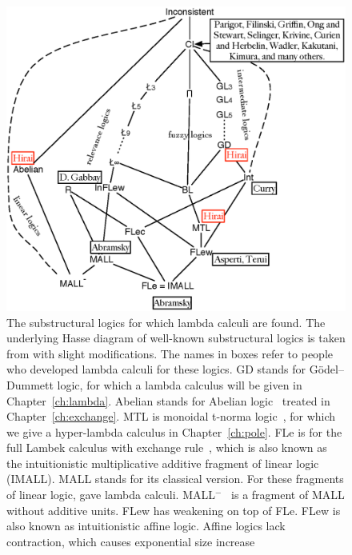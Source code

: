  \begin{figure}
  \centering
  \includegraphics[scale=0.8]{lattice.eps}
  \caption[The lattice of substructural logics, some of which with known lambda calculi.]
  {\small
  The substructural logics for which lambda calculi are found.
  The underlying Hasse diagram of well-known substructural logics is
  taken from
  \cite[p.~120]{residuated} with slight modifications.
  The names in boxes refer to people who developed lambda calculi for
  these logics.{
  \textsf{GD} stands for G\"odel--Dummett logic, for which
  a lambda calculus will be given in
  Chapter~\ref{ch:lambda}.
  \textsf{Abelian} stands for Abelian
  logic~\citep{meyer-slaney-1989,casari1989,metcalfe2002}
  treated in Chapter~\ref{ch:exchange}.
  \textsf{MTL} is monoidal t-norma logic~\cite{Esteva2001271}, for which
  we give a hyper-lambda calculus in Chapter~\ref{ch:pole}.
  \textsf{FLe} is for the full Lambek calculus with exchange
  rule~\citep[p.86]{residuated}, which is also known as the
  intuitionistic
  multiplicative additive fragment of linear logic (\textsf{IMALL}).
  \textsf{MALL} stands for its classical version.  For these fragments of linear
  logic,
  \citet{abramsky1993computational} gave lambda calculi.
  \textsf{MALL}$^-$~\citep{girard1987}
  is a fragment of \textsf{MALL} without additive
  units.
  \textsf{FLew} has weakening on top of \textsf{FLe}.
  \textsf{FLew} is also known as intuitionistic affine logic.
  Affine logics lack contraction, which causes exponential size increase
}}
\end{figure}
